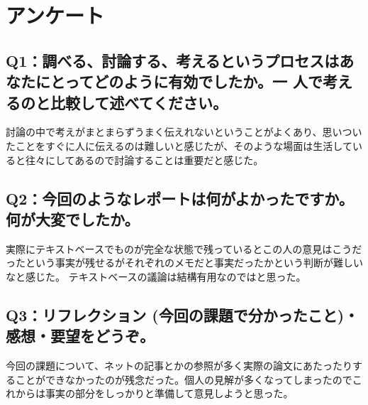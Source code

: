 \documentclass[12pt,a4j]{jarticle}
\begin{document}
\section{アンケート}

\subsection{Q1：調べる、討論する、考えるというプロセスはあなたにとってどのように有効でしたか。一 人で考えるのと比較して述べてください。}
討論の中で考えがまとまらずうまく伝えれないということがよくあり、思いついたことをすぐに人に伝えるのは難しいと感じたが、そのような場面は生活していると往々にしてあるので討論することは重要だと感じた。

\subsection{Q2：今回のようなレポートは何がよかったですか。何が大変でしたか。}
実際にテキストベースでものが完全な状態で残っているとこの人の意見はこうだったという事実が残せるがそれぞれのメモだと事実だったかという判断が難しいなと感じた。
テキストベースの議論は結構有用なのではと思った。
\subsection{Q3：リフレクション (今回の課題で分かったこと)・感想・要望をどうぞ。}
今回の課題について、ネットの記事とかの参照が多く実際の論文にあたったりすることができなかったのが残念だった。個人の見解が多くなってしまったのでこれからは事実の部分をしっかりと準備して意見しようと思った。
\end{document}
